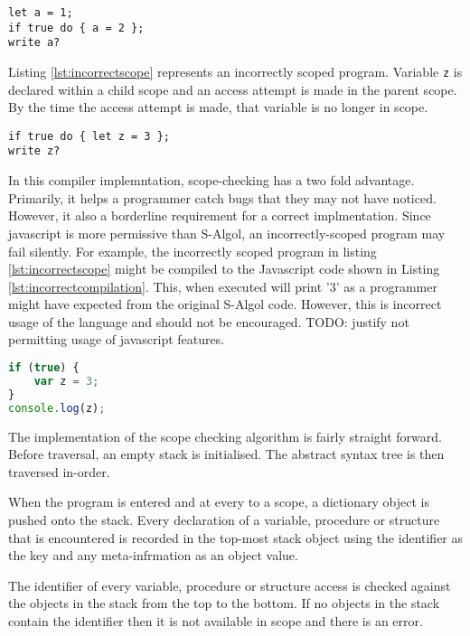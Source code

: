 \documentclass{article}
\begin{document}
\begin{lstlisting}[caption={Correctly scoped program},label={lst:correctscope}, escapechar="|"]
let a = 1;
if true do { a = 2 };
write a?
\end{lstlisting}

Listing \ref{lst:incorrectscope} represents an incorrectly scoped program. Variable \lstinline{z} is declared within a child scope and an access attempt is made in the parent scope. By the time the access attempt is made, that variable is no longer in scope. 

\begin{lstlisting}[caption={Incorrectly scoped program},label={lst:incorrectscope}, escapechar="|"]
if true do { let z = 3 };
write z?
\end{lstlisting}

In this compiler implemntation, scope-checking has a two fold advantage. Primarily, it helps a programmer catch bugs that they may not have noticed. However, it also a borderline requirement for a correct implmentation. Since javascript is more permissive than S-Algol, an incorrectly-scoped program may fail silently. For example, the incorrectly scoped program in listing \ref{lst:incorrectscope} might be compiled to the Javascript code shown in Listing \ref{lst:incorrectcompilation}. This, when executed will print '3' as a programmer might have expected from the original S-Algol code. However, this is incorrect usage of the language and should not be encouraged. TODO: justify not permitting usage of javascript features.

\begin{lstlisting}[caption={Possible compilation of Listing \ref{lst:incorrectscope}},label={lst:incorrectcompilation}, language=javascript]
if (true) {
	var z = 3;
}
console.log(z);
\end{lstlisting}

The implementation of the scope checking algorithm is fairly straight forward. Before traversal, an empty stack is initialised. The abstract syntax tree is then traversed in-order.

When the program is entered and at every to a scope, a dictionary object is pushed onto the stack. Every declaration of a variable, procedure or structure that is encountered is recorded in the top-most stack object using the identifier as the key and any meta-infrmation as an object value.

The identifier of every variable, procedure or structure access is checked against the objects in the stack from the top to the bottom. If no objects in the stack contain the identifier then it is not available in scope and there is an error.
\end{document}
